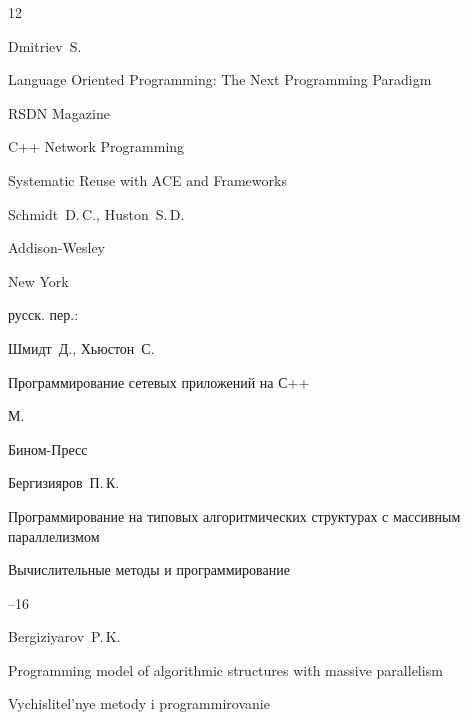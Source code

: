 \begin{thebibliography}{12}
\misctransl 

\by Dmitriev~S. 

\paper  Language Oriented Programming: The Next Programming Paradigm 

\jour RSDN Magazine








\book C++ Network Programming


\volinfo Systematic Reuse with ACE and Frameworks

\by Schmidt~D.\,C., Huston~S.\,D. 


\publ Addison-Wesley

\publaddr New York


\rtransl русск. пер.:~

\by Шмидт~Д., Хьюстон~С. 

\book Программирование сетевых приложений на С++


\publaddr М.

\publ Бином-Пресс






\by Бергизияров~П.\,К. 

\paper Программирование на типовых алгоритмических структурах с массивным параллелизмом 

\jour Вычислительные методы и программирование 




--16

\misctransl 

\by Bergiziyarov~P.\,K.

\paper Programming model of algorithmic structures with massive parallelism

\jour Vychislitel'nye metody i programmirovanie





\end{thebibliography}
